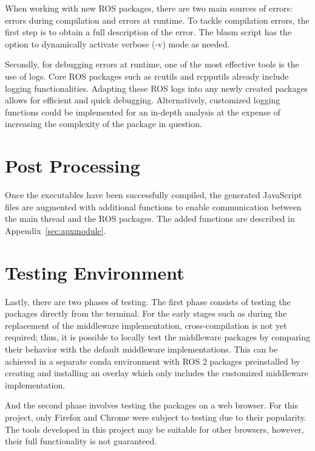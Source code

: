     When working with new ROS packages, there are two main sources of errors: errors during compilation and errors at runtime. To tackle compilation errors, the first step is to obtain a full description of the error. The \textsf{blasm} script has the option to dynamically activate verbose (\textsf{-v}) mode as needed.

    Secondly, for debugging errors at runtime, one of the most effective tools is the use of logs. Core \ac{ROS} packages such as \textsf{rcutils} and \textsf{rcpputils} already include logging functionalities. Adapting these \ac{ROS} logs into any newly created packages allows for efficient and quick debugging. Alternatively, customized logging functions could be implemented for an in-depth analysis at the expense of increasing the complexity of the package in question.

\section{Post Processing}

    Once the executables have been successfully compiled, the generated JavaScript files are augmented with additional functions to enable communication between the main thread and the ROS packages. The added functions are described in Appendix~\ref{sec:apxmodule}.

\section{Testing Environment}

    Lastly, there are two phases of testing. The first phase consists of testing the packages directly from the terminal. For the early stages such as during the replacement of the middleware implementation, cross-compilation is not yet required; thus, it is possible to locally test the middleware packages by comparing their behavior with the default middleware implementations. This can be achieved in a separate \textsf{conda} environment with \ac{ROS} 2 packages preinstalled by creating and installing an overlay which only includes the customized middleware implementation.

    And the second phase involves testing the packages on a web browser. For this project, only Firefox and Chrome were subject to testing due to their popularity. The tools developed in this project may be suitable for other browsers, however, their full functionality is not guaranteed.
